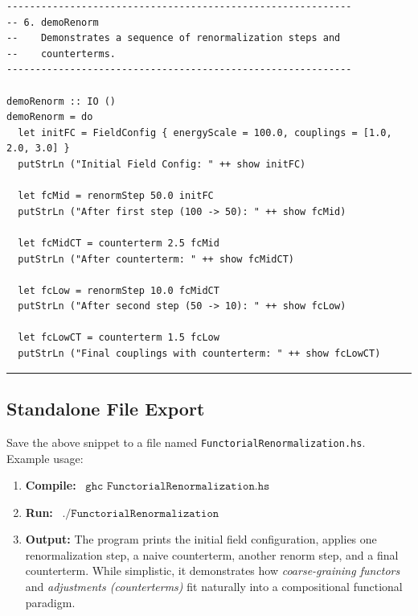 \documentclass[12pt]{article}
\begin{document}
\begin{verbatim}
------------------------------------------------------------
-- 6. demoRenorm
--    Demonstrates a sequence of renormalization steps and
--    counterterms.
------------------------------------------------------------

demoRenorm :: IO ()
demoRenorm = do
  let initFC = FieldConfig { energyScale = 100.0, couplings = [1.0, 2.0, 3.0] }
  putStrLn ("Initial Field Config: " ++ show initFC)

  let fcMid = renormStep 50.0 initFC
  putStrLn ("After first step (100 -> 50): " ++ show fcMid)

  let fcMidCT = counterterm 2.5 fcMid
  putStrLn ("After counterterm: " ++ show fcMidCT)

  let fcLow = renormStep 10.0 fcMidCT
  putStrLn ("After second step (50 -> 10): " ++ show fcLow)

  let fcLowCT = counterterm 1.5 fcLow
  putStrLn ("Final couplings with counterterm: " ++ show fcLowCT)
\end{verbatim}
\noindent\rule{\textwidth}{0.4pt}

\subsection{Standalone File Export}

Save the above snippet to a file named \texttt{FunctorialRenormalization.hs}. Example usage:

\begin{enumerate}[label=(\roman*)]
\item \textbf{Compile:} \ 
\(\texttt{ghc FunctorialRenormalization.hs}\)

\item \textbf{Run:} \ 
\(\texttt{./FunctorialRenormalization}\)

\item \textbf{Output:}  
The program prints the initial field configuration, applies one renormalization step, a naive counterterm, 
another renorm step, and a final counterterm. While simplistic, it demonstrates how \emph{coarse-graining functors} 
and \emph{adjustments (counterterms)} fit naturally into a compositional functional paradigm.
\end{enumerate}

\vspace{1em}
\end{document}
